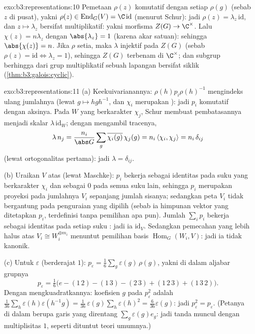 \begin{solution}{exo:b3:representations:10}
Pemetaan $\rho(z)$ komutatif dengan setiap $\rho(g)$ (sebab $z$ di pusat), yakni
$\rho(z) \in \operatorname{End}_G(V) = \C\,\mathrm{id}$ (menurut Schur):
jadi $\rho(z) = \lambda_z\,\mathrm{id}$, dan $z \mapsto \lambda_z$ bersifat
multiplikatif: yakni morfisma $Z(G) \to \C^\times$. Lalu
$\chi(z) = n\lambda_z$ dengan $\abs{\lambda_z} = 1$ (karena akar
satuan): sehingga $\abs{\chi(z)} = n$. Jika $\rho$ setia, maka $\lambda$
injektif pada $Z(G)$ (sebab $\rho(z) = \mathrm{id} \iff \lambda_z =
1$), sehingga $Z(G)$ terbenam di $\C^\times$; dan subgrup berhingga dari
grup multiplikatif sebuah lapangan bersifat siklik
(\cref{thm:b3:galois:cyclic}).
\end{solution}

\begin{solution}{exo:b3:representations:11}
(a) Keekuivarianannya: $\rho(h)p_i\rho(h)^{-1}$ mengindeks ulang jumlahnya
(lewat $g \mapsto hgh^{-1}$, dan $\chi_i$ merupakan ):
jadi $p_i$ komutatif dengan aksinya. Pada $W$  yang
berkarakter $\chi_j$, Schur membuat pembatasannya menjadi skalar
$\lambda\,\mathrm{id}_W$; dengan mengambil tracenya,
\[
\lambda\,n_j = \frac{n_i}{\abs G}\sum_g
\overline{\chi_i(g)}\,\chi_j(g) = n_i\,\langle\chi_i,
\chi_j\rangle = n_i\,\delta_{ij}
\]
(lewat ortogonalitas pertama): jadi $\lambda = \delta_{ij}$.

(b) Uraikan $V$ atas  (lewat Maschke): $p_i$ bekerja sebagai
identitas pada suku yang berkarakter $\chi_i$ dan sebagai $0$ pada
semua suku lain, sehingga $p_i$ merupakan proyeksi pada jumlahnya $V_i$
sepanjang jumlah sisanya; sedangkan peta $V_i$ tidak bergantung pada
penguraian yang dipilih (sebab ia himpunan vektor yang ditetapkan
$p_i$, terdefinisi tanpa pemilihan apa pun). Jumlah $\sum_ip_i$ bekerja sebagai identitas
pada setiap suku : jadi ia $\mathrm{id}_V$. Sedangkan
pemecahan yang lebih halus atas $V_i \cong W_i^{\oplus m_i}$ menuntut
pemilihan basis $\operatorname{Hom}_G(W_i, V)$: jadi ia tidak kanonik.

(c) Untuk $\varepsilon$ (berderajat $1$): $p_\varepsilon =
\frac1{6}\sum_{g}\varepsilon(g)\,\rho(g)$, yakni di dalam aljabar
grupnya
\[
p_\varepsilon = \tfrac16\bigl(e - (1\,2) - (1\,3) - (2\,3)
+ (1\,2\,3) + (1\,3\,2)\bigr) .
\]
Dengan mengkuadratkannya: koefisien $g$ pada $p_\varepsilon^2$ adalah
$\frac1{36}\sum_{h}\varepsilon(h)\varepsilon(h^{-1}g) =
\frac1{36}\,\varepsilon(g)\sum_h\varepsilon(h)^2 =
\frac{6}{36}\varepsilon(g)$: jadi $p_\varepsilon^2 =
p_\varepsilon$. (Petanya di dalam  berupa
garis yang direntang $\sum_g\varepsilon(g)e_g$: jadi 
tanda muncul dengan multiplisitas $1$, seperti dituntut teori
umumnya.)
\end{solution}

